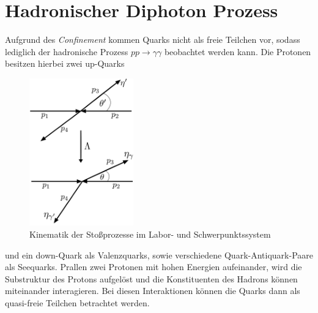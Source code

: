 \section{Hadronischer Diphoton Prozess}
Aufgrund des \textit{Confinement} kommen Quarks nicht als freie Teilchen vor, sodass lediglich der hadronische Prozess $pp \rightarrow \gamma \gamma$ beobachtet werden kann.  Die Protonen besitzen hierbei zwei up-Quarks
\begin{figure}
	\includegraphics[width=45mm]{graphics/Kinematik}
	\caption{Kinematik der Stoßprozesse im Labor- und Schwerpunktssystem}
	\label{Kinematik}
\end{figure}
   und ein down-Quark als Valenzquarks, sowie verschiedene Quark-Antiquark-Paare als Seequarks. Prallen zwei Protonen mit hohen Energien aufeinander, wird die Substruktur des Protons aufgelöst und die Konstituenten des Hadrons können miteinander interagieren. Bei diesen Interaktionen können die Quarks dann als quasi-freie Teilchen betrachtet werden.

